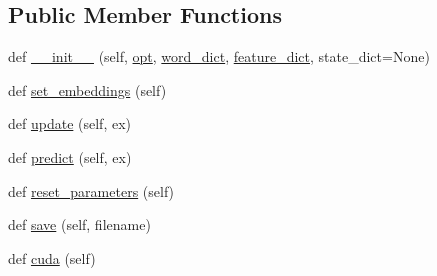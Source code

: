 \subsection*{Public Member Functions}
\begin{DoxyCompactItemize}
\item 
def \hyperlink{classparlai_1_1agents_1_1drqa_1_1model_1_1DocReaderModel_ab669b8ef6f50f9c6d81f3544c42727e9}{\+\_\+\+\_\+init\+\_\+\+\_\+} (self, \hyperlink{classparlai_1_1agents_1_1drqa_1_1model_1_1DocReaderModel_ae6b1a15378e076ef66f15bf4183f8d69}{opt}, \hyperlink{classparlai_1_1agents_1_1drqa_1_1model_1_1DocReaderModel_a2c53c78892ade8ebd82cb581608d58dd}{word\+\_\+dict}, \hyperlink{classparlai_1_1agents_1_1drqa_1_1model_1_1DocReaderModel_a89edfda425c66170c166156d5f3e8a18}{feature\+\_\+dict}, state\+\_\+dict=None)
\item 
def \hyperlink{classparlai_1_1agents_1_1drqa_1_1model_1_1DocReaderModel_a6d563b82872da6b70b2801f2acfcac32}{set\+\_\+embeddings} (self)
\item 
def \hyperlink{classparlai_1_1agents_1_1drqa_1_1model_1_1DocReaderModel_afd9953bd722fe099619e883981e3fc38}{update} (self, ex)
\item 
def \hyperlink{classparlai_1_1agents_1_1drqa_1_1model_1_1DocReaderModel_a798f609dcd78b3e66e00a81f26f12603}{predict} (self, ex)
\item 
def \hyperlink{classparlai_1_1agents_1_1drqa_1_1model_1_1DocReaderModel_ac509d418866e6d8bd2ad29eaf1152f52}{reset\+\_\+parameters} (self)
\item 
def \hyperlink{classparlai_1_1agents_1_1drqa_1_1model_1_1DocReaderModel_af50a0adfb1e85342655305813c814f86}{save} (self, filename)
\item 
def \hyperlink{classparlai_1_1agents_1_1drqa_1_1model_1_1DocReaderModel_aaefd7c0afecedb97555c466befd2a68c}{cuda} (self)
\end{DoxyCompactItemize}
